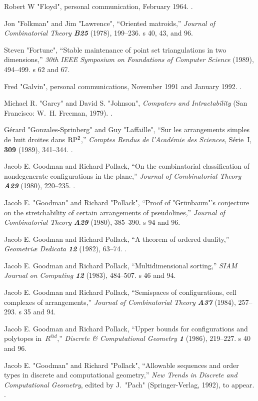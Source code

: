 \bib[20]
Robert W "Floyd", personal communication, February 1964.
.

\bib[21]
Jon "Folkman" and Jim "Lawrence", ``Oriented matroids,'' {\sl Journal of
Combinatorial Theory\/ \bf B25} (1978), 199--236.
\>s 40, 43, and 96.

\bib[22]
Steven "Fortune", ``Stable maintenance of point set triangulations in
two dimensions,'' {\sl 30th IEEE Symposium on Foundations of Computer
Science\/} (1989), 494--499.
\>s 62 and 67.

\bib[23]
Fred "Galvin", personal communications, November 1991 and January 1992.
.

\bib[24]
Michael R. "Garey" and David S. "Johnson", {\sl Computers and
Intractability\/} (San Francisco: W.~H. Freeman, 1979).
.

\bib[25]
G\'erard "Gonzales-Sprinberg" and Guy "Laffaille", ``Sur les
arrangements simples de huit droites dans $\rm RP^2$,'' {\sl Comptes
Rendus de l'Acad\'emie des Sciences}, S\'erie~I, {\bf309} (1989), 341--344.
.

\bib[26]
Jacob E. Goodman and Richard Pollack,
``On the combinatorial classification of nondegenerate configurations
in the plane,'' {\sl Journal of Combinatorial Theory\/ \bf A29}
(1980), 220--235.
.

\bib[27]
Jacob E. "Goodman" and Richard "Pollack",
``Proof of "Gr\"unbaum"'s conjecture on the stretchability of certain
arrangements of pseudolines,''
{\sl Journal of Combinatorial Theory\/ \bf A29} (1980), 385--390.
\>s 94 and 96.

\bib[28]
Jacob E. Goodman and Richard Pollack, ``A theorem of ordered
duality,''
{\sl Geometri{\ae} Dedicata\/ \bf 12} (1982), 63--74.
.

\bib[29]
Jacob E. Goodman and Richard Pollack,
``Multidimensional sorting,'' {\sl SIAM Journal on Computing\/ \bf 12}
(1983), 484--507.
\>s 46 and 94.

\bib[30]
 Jacob E. Goodman and Richard Pollack,
``Semispaces of configurations, cell complexes of arrangements,''
{\sl Journal of Combinatorial Theory\/ \bf A37} (1984), 257--293.
\>s 35 and 94.

\bib[31]
 Jacob E. Goodman and Richard Pollack,
``Upper bounds for configurations and polytopes in~$R^{@d}$,'' {\sl
Discrete \& Computational Geometry\/ \bf 1} (1986), 219--227.
\>s 40 and 96.

\bib[32]
Jacob E. "Goodman" and Richard "Pollack", ``Allowable sequences and
order types in discrete and computational geometry,''
{\sl New Trends in Discrete and Computational Geometry}, edited by
J.~"Pach" (Springer-Verlag, 1992), to appear.
.

